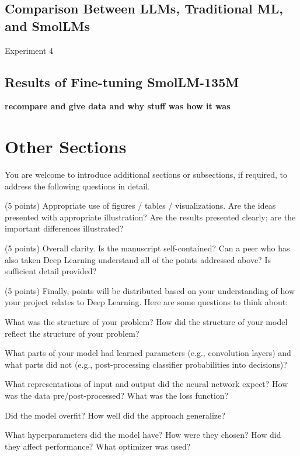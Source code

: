 \documentclass[10pt,twocolumn,letterpaper]{article}
\begin{document}
\subsection{Comparison Between LLMs, Traditional ML, and SmolLMs}
Experiment 4




\subsection{Results of Fine-tuning SmolLM-135M}
\textbf{recompare and give data and why stuff was how it was}


\section{Other Sections}





You are welcome to introduce additional sections or subsections, if required, to address the following questions in detail. 

(5 points) Appropriate use of figures / tables / visualizations. Are the ideas presented with appropriate illustration? Are the results presented clearly; are the important differences illustrated? 

(5 points) Overall clarity. Is the manuscript self-contained? Can a peer who has also taken Deep Learning understand all of the points addressed above? Is sufficient detail provided? 

(5 points) Finally, points will be distributed based on your understanding of how your project relates to Deep Learning. Here are some questions to think about: 

What was the structure of your problem? How did the structure of your model reflect the structure of your problem? 

What parts of your model had learned parameters (e.g., convolution layers) and what parts did not (e.g., post-processing classifier probabilities into decisions)? 

What representations of input and output did the neural network expect? How was the data pre/post-processed?
What was the loss function? 

Did the model overfit? How well did the approach generalize? 

What hyperparameters did the model have? How were they chosen? How did they affect performance? What optimizer was used? 
\end{document}
